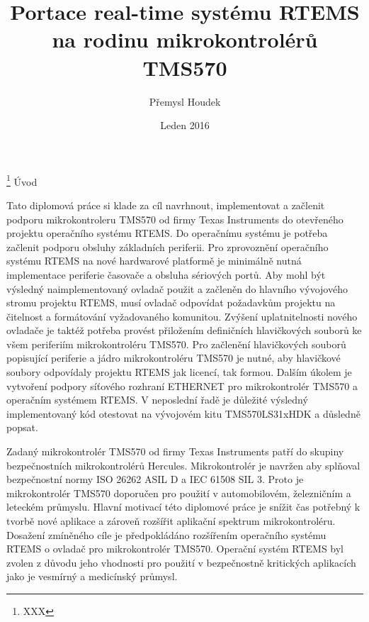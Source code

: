 

\worktype [M/CZ]
\title {Portace real-time systému RTEMS na rodinu mikrokontrolérů TMS570}
\author {Přemysl Houdek}
\date {Leden 2016}
\thanks {XXX}
{}
\makefront
\chap Úvod

Tato diplomová práce si klade za cíl navrhnout, implementovat a začlenit podporu mikrokontroleru TMS570 od firmy Texas Instruments do otevřeného projektu operačního systému RTEMS.
Do operačnímu systému je potřeba začlenit podporu obsluhy základních periferii. Pro zprovoznění operačního systému RTEMS na nové hardwarové platformě je minimálně nutná implementace periferie časovače a obsluha sériových portů.
Aby mohl být výsledný naimplementovaný ovladač použit a začleněn do hlavního vývojového stromu projektu RTEMS, musí ovladač odpovídat požadavkům projektu na čitelnost a formátování vyžadovaného komunitou.
Zvýšení uplatnitelnosti nového ovladače je taktéž potřeba provést přiložením definičních hlavičkových souborů ke všem periferiím mikrokontroléru TMS570. Pro začlenění hlavičkových souborů popisující periferie a jádro mikrokontroléru TMS570 je nutné, aby hlavičkové soubory odpovídaly projektu RTEMS jak licencí, tak formou.
Dalším úkolem je vytvoření podpory síťového rozhraní ETHERNET pro mikrokontrolér TMS570 a operačním systémem RTEMS.
V neposlední řadě je důležité výsledný implementovaný kód otestovat na vývojovém kitu TMS570LS31xHDK a důsledně popsat.

\medskip

Zadaný mikrokontrolér TMS570 od firmy Texas Instruments patří do skupiny bezpečnostních mikrokontrolérů Hercules. Mikrokontrolér je navržen aby splňoval bezpečnostní normy ISO 26262 ASIL D a IEC 61508 SIL 3. Proto je mikrokontrolér TMS570 doporučen pro použití v automobilovém, železničním a leteckém průmyslu. Hlavní motivací této diplomové práce je snížit čas potřebný k tvorbě nové aplikace a zároveň rozšířit aplikační spektrum mikrokontroléru. Dosažení zmíněného cíle je předpokládáno rozšířením operačního systému RTEMS o ovladač pro mikrokontrolér TMS570. Operační systém RTEMS byl zvolen z důvodu jeho vhodnosti pro použití v bezpečnostně kritických aplikacích jako je vesmírný a medicínský průmysl.

